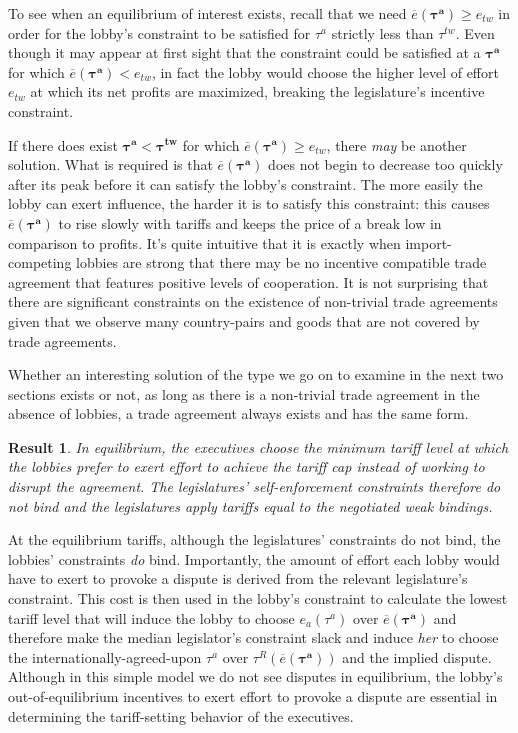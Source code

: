\documentclass[authoryear, review]{elsarticle}
\newtheorem{result}{Result}
\newcommand{\ov}{\overline}
\newcommand{\bta}{\bm{\tau^a}}
\newcommand{\btw}{\bm{\tau^{tw}}}
\begin{document}
To see when an equilibrium of interest exists, recall that we need $\ov{e}(\bta) \geq e_{tw}$ in order for the lobby's constraint to be  satisfied for $\tau^a$ strictly less than $\tau^{tw}$. Even though it may appear at first sight that the constraint could be satisfied at a $\bta$ for which $\ov{e}(\bta) < e_{tw}$, in fact the lobby would choose the higher level of effort $e_{tw}$ at which its net profits are maximized, breaking the legislature's incentive constraint. 

If there does exist $\bta < \btw$ for which $\ov{e}(\bta) \geq e_{tw}$, there \textit{may} be another solution. What is required is that $\ov{e}(\bta)$ does not begin to decrease too quickly after its peak before it can satisfy the lobby's constraint. The more easily the lobby can exert influence, the harder it is to satisfy this constraint: this causes $\ov{e}(\bta)$ to rise slowly with tariffs and keeps the price of a break low in comparison to profits. It's quite intuitive that it is exactly when import-competing lobbies are strong that there may be no incentive compatible trade agreement that features positive levels of cooperation. It is not surprising that there are significant constraints on the existence of non-trivial trade agreements given that we observe many country-pairs and goods that are not covered by trade agreements.

Whether an interesting solution of the type we go on to examine in the next two sections exists or not, as long as there is a non-trivial trade agreement in the absence of lobbies, a trade agreement always exists and has the same form.				

\begin{result}
  In equilibrium, the executives choose the minimum tariff level at which the lobbies prefer to exert effort to achieve the tariff cap instead of working to disrupt the agreement. The legislatures' self-enforcement constraints therefore do not bind and the legislatures apply tariffs equal to the negotiated weak bindings.
  \label{res:eqm}
\end{result}
At the equilibrium tariffs, although the legislatures' constraints do not bind, the lobbies' constraints \textit{do} bind. Importantly, the amount of effort each lobby would have to exert to provoke a dispute is derived from the relevant legislature's constraint. This cost is then used in the lobby's constraint to calculate the lowest tariff level that will induce the lobby to choose $e_a(\tau^a)$ over $\ov{e}(\bta)$ and therefore make the median legislator's constraint slack and induce \textit{her} to choose the internationally-agreed-upon $\tau^a$ over $\tau^R(\ov{e}(\bta))$ and the implied dispute. Although in this simple model we do not see disputes in equilibrium, the lobby's out-of-equilibrium incentives to exert effort to provoke a dispute are essential in determining the tariff-setting behavior of the executives.
\end{document}
